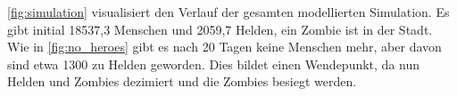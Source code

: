     \autoref{fig:simulation} visualisiert den Verlauf der gesamten modellierten Simulation. Es gibt initial 18537,3 Menschen und 2059,7 Helden, ein Zombie ist in der Stadt. Wie in \autoref{fig:no_heroes} gibt es nach 20 Tagen keine Menschen mehr, aber davon sind etwa 1300 zu Helden geworden. Dies bildet einen Wendepunkt, da nun Helden und Zombies dezimiert und die Zombies besiegt werden.
